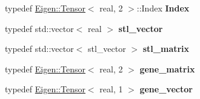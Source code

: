 \begin{DoxyCompactItemize}
typedef \hyperlink{class_eigen_1_1_tensor}{Eigen\+::\+Tensor}$<$ real, 2 $>$\+::Index {\bfseries Index}
\item 
\mbox{\label{classtensor__interface_a16dac22850837e02cddb80efdd2e1882}} 
typedef std\+::vector$<$ real $>$ {\bfseries stl\+\_\+vector}
\item 
\mbox{\label{classtensor__interface_a3529526e75d1be756047a90bace424ed}} 
typedef std\+::vector$<$ stl\+\_\+vector $>$ {\bfseries stl\+\_\+matrix}
\item 
\mbox{\label{classtensor__interface_ae745087cb2eb6ffd72b7cdbae2b63e0f}} 
typedef \hyperlink{class_eigen_1_1_tensor}{Eigen\+::\+Tensor}$<$ real, 2 $>$ {\bfseries gene\+\_\+matrix}
\item 
\mbox{\label{classtensor__interface_ac0fd2d09e933ae3b7edefe9b52e8472d}} 
typedef \hyperlink{class_eigen_1_1_tensor}{Eigen\+::\+Tensor}$<$ real, 1 $>$ {\bfseries gene\+\_\+vector}
\end{DoxyCompactItemize}
